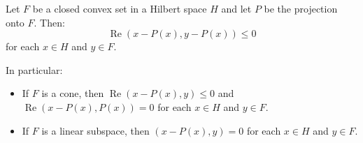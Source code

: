 Let $F$ be a closed convex set in a Hilbert space $H$ and let $P$ be the projection onto $F$. Then:
$$
\operatorname{Re} (x - P(x), y - P(x)) \leq 0
$$
for each $x \in H$ and $y \in F$.

In particular:
\begin{itemize}
\item If $F$ is a cone, then $\operatorname{Re} (x - P(x), y) \leq 0$ and $\operatorname{Re} (x - P(x), P(x)) = 0$ for each $x \in H$ and $y \in F$.
\item If $F$ is a linear subspace, then $(x - P(x), y) = 0$ for each $x \in H$ and $y \in F$.
\end{itemize}
